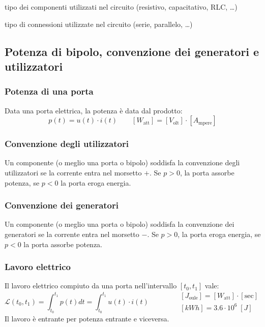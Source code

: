 \documentclass[a4paper]{article}
\begin{document}
\begin{description}[itemsep=0pt]
	\item[Tipologia] tipo dei componenti utilizzati nel circuito (resistivo, capacitativo, RLC, \dots)
	\item[Topologia] tipo di connessioni utilizzate nel circuito (serie, parallelo, \dots)
\end{description}

\subsection{Potenza di bipolo, convenzione dei generatori e utilizzatori}
\subsubsection*{Potenza di una porta}
Data una porta elettrica, la potenza è data dal prodotto:
\[p(t) = u(t) \cdot i(t) \qquad [W_\text{att}] = [V_\text{olt}] \cdot [A_\text{mpere}]\]

\subsubsection*{Convenzione degli utilizzatori}
Un componente (o meglio una porta o bipolo) soddisfa la convenzione degli utilizzatori se la corrente entra nel morsetto \(+\).
Se \(p > 0\), la porta assorbe potenza, se \(p < 0\) la porta eroga energia.

\subsubsection*{Convenzione dei generatori}
Un componente (o meglio una porta o bipolo) soddisfa la convenzione dei generatori se la corrente entra nel morsetto \(-\).
Se \(p > 0\), la porta eroga energia, se \(p < 0\) la porta assorbe potenza.

\subsubsection*{Lavoro elettrico}
Il lavoro elettrico compiuto da una porta nell'intervallo \([t_0, t_1]\) vale:
\[\mathcal{L}(t_0,t_1) = \int_{t_0}^{t_1} p(t) dt = \int_{t_0}^{t_1} u(t) \cdot i(t) \qquad\qquad
\begin{matrix} [J_\text{oule}] = [W_\text{att}] \cdot [\text{sec}] \\[5pt] [kWh] = 3.6 \cdot 10^6 \; [J] \end{matrix}\]
Il lavoro è entrante per potenza entrante e viceversa.
\end{document}
